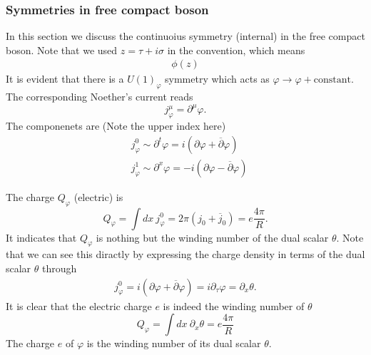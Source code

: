 \subsubsection{Symmetries in free compact boson}
In this section we discuss the continuoius symmetry (internal) in the free compact boson. Note that we used $z = \tau + i\sigma$ in the convention, which means
\begin{equation}
	\begin{aligned}
		\phi(z) 
	\end{aligned}
\end{equation}
It is evident that there is a ${U(1)}_\varphi$ symmetry which acts as $\varphi \rightarrow \varphi + \mathrm{constant}$. The corresponding Noether's current reads
\begin{equation}
	j^\mu_\varphi = \partial^\mu \varphi.
\end{equation}  
The componenets are (Note the upper index here)
\begin{equation}
	\begin{aligned}
		&j^0_\varphi \sim \partial^t\varphi = i \left(\partial \varphi + \overline{\partial} {\varphi}\right) \\
		&j^1_\varphi \sim \partial^x\varphi = -i\left( \partial \varphi - \overline{\partial}\varphi \right)
	\end{aligned}
\end{equation}

The charge $Q_\varphi$ (electric) is 
\begin{equation}
	Q_\varphi = \int dx \ j^0_\varphi = 2\pi\left(j_0 + \overline{j}_0\right) = e \frac{4\pi}{R}.
\end{equation}
It indicates that $Q_\varphi$ is nothing but the winding number of the dual scalar $\theta$. Note that we can see this diractly by expressing the charge density in terms of the dual scalar $\theta$ through
\begin{equation}
	\begin{aligned}
		j^0_\varphi = i \left(\partial \varphi + \overline{\partial} \varphi\right) = i \partial_\tau \varphi = \partial_x \theta.
	\end{aligned}
\end{equation}
It is clear that the electric charge $e$ is indeed the winding number of $\theta$ 
\begin{equation}
	Q_\varphi = \int dx \ \partial_x \theta = e \frac{4\pi}{R}
\end{equation}
The charge $e$ of $\varphi$ is the winding number of its dual scalar $\theta$.

